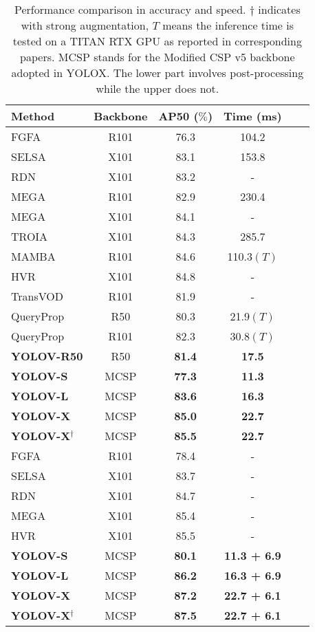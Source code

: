 \documentclass[letterpaper]{article} \usepackage{aaai23}  \usepackage{times}  \usepackage{helvet}  \usepackage{courier}  \usepackage[hyphens]{url}  \usepackage{graphicx} \urlstyle{rm} \def\UrlFont{\rm}  \usepackage{natbib}  \usepackage{caption} \usepackage{xcolor}
\begin{document}
\setlength{\tabcolsep}{4pt}
\begin{table}[t]
\begin{center}
\begin{tabular}{l|ccccc}
\hline\noalign{\smallskip}
Method & Backbone  & AP50 ($\%$) & Time (ms)  \\
\hline
\noalign{\smallskip}
FGFA & R101   & 76.3 & 104.2  \\
SELSA & X101   & 83.1 & 153.8  \\ 
RDN & X101   & 83.2 & -  \\
MEGA & R101   & 82.9 & 230.4  \\
MEGA & X101   & 84.1 & -  \\
TROIA & X101   & 84.3 & 285.7  \\
MAMBA & R101   & 84.6 & 110.3$(T)$  \\
HVR & X101   & 84.8 & -  \\
TransVOD & R101   & 81.9 & -  \\
QueryProp & R50  & 80.3 & 21.9$(T)$  \\
QueryProp & R101  & 82.3 & 30.8$(T)$  \\
\hline
\noalign{\smallskip}
\textbf{YOLOV-R50} & R50    & \textbf{81.4} & \textbf{17.5}  \\
\textbf{YOLOV-S} & MCSP    & \textbf{77.3} & \textbf{11.3}  \\
\textbf{YOLOV-L} & MCSP    & \textbf{83.6} & \textbf{16.3}  \\
\textbf{YOLOV-X} & MCSP    & \textbf{85.0} & \textbf{22.7}  \\
\textbf{YOLOV-X$^\dagger$} & MCSP   & \textbf{85.5} & \textbf{22.7}  \\
\hline
\hline
\noalign{\smallskip}
FGFA & R101   & 78.4 & - \\
SELSA & X101   & 83.7 & - \\
RDN & X101   & 84.7 & - \\
MEGA & X101   & 85.4 & - \\
HVR & X101   & 85.5 & -\\
\hline
\noalign{\smallskip}
\textbf{YOLOV-S} & MCSP    & \textbf{80.1} & \textbf{11.3 + 6.9} \\
\textbf{YOLOV-L}& MCSP    & \textbf{86.2} & \textbf{16.3 + 6.9}\\
\textbf{YOLOV-X}& MCSP    & \textbf{87.2} & \textbf{22.7 + 6.1}\\
\textbf{YOLOV-X$^\dagger$} & MCSP   & \textbf{87.5} & \textbf{22.7 + 6.1}\\
\hline
\end{tabular}
\end{center}
\caption{Performance comparison in accuracy and speed. $\dagger$ indicates with strong augmentation, $T$ means the inference time is tested on a TITAN RTX GPU as reported in corresponding papers. MCSP stands for the Modified CSP v5 backbone adopted in YOLOX. The lower part involves post-processing while the upper does not.}
\label{table:compare w post}
\end{table}
\end{document}
